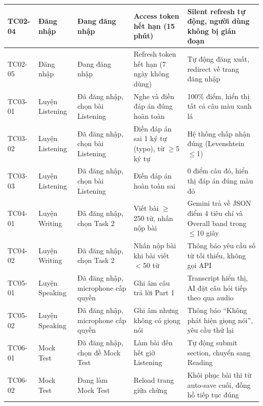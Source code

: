 \documentclass[a4paper,12pt]{extreport}
\begin{document}
\begin{longtable}{|p{1.3cm}|p{2.8cm}|p{2.8cm}|p{4.0cm}|p{3.0cm}|}
    TC02-04 & Đăng nhập & Đang đăng nhập & Access token hết hạn (15 phút) & Silent refresh tự động, người dùng không bị gián đoạn \\ \hline

    TC02-05 & Đăng nhập & Đang đăng nhập & Refresh token hết hạn (7 ngày không dùng) & Tự động đăng xuất, redirect về trang đăng nhập \\ \hline

    TC03-01 & Luyện Listening & Đã đăng nhập, chọn bài Listening & Nghe và điền đáp án đúng hoàn toàn & 100\% điểm, hiển thị tất cả câu màu xanh lá \\ \hline

    TC03-02 & Luyện Listening & Đã đăng nhập, chọn bài Listening & Điền đáp án sai 1 ký tự (typo), từ $\geq$5 ký tự & Hệ thống chấp nhận đúng (Levenshtein $\leq$1) \\ \hline

    TC03-03 & Luyện Listening & Đã đăng nhập, chọn bài Listening & Điền đáp án hoàn toàn sai & 0 điểm câu đó, hiển thị đáp án đúng màu đỏ \\ \hline

    TC04-01 & Luyện Writing & Đã đăng nhập, chọn Task 2 & Viết bài $\geq$250 từ, nhấn nộp bài & Gemini trả về JSON điểm 4 tiêu chí và Overall band trong $\leq$10 giây \\ \hline

    TC04-02 & Luyện Writing & Đã đăng nhập, chọn Task 2 & Nhấn nộp bài khi bài viết $<$50 từ & Thông báo yêu cầu số từ tối thiểu, không gọi API \\ \hline

    TC05-01 & Luyện Speaking & Đã đăng nhập, microphone cấp quyền & Ghi âm câu trả lời Part 1 & Transcript hiển thị, AI đặt câu hỏi tiếp theo qua audio \\ \hline

    TC05-02 & Luyện Speaking & Đã đăng nhập, microphone cấp quyền & Ghi âm nhưng không có giọng nói & Thông báo ``Không phát hiện giọng nói'', yêu cầu thử lại \\ \hline

    TC06-01 & Mock Test & Đã đăng nhập, chọn đề Mock Test & Làm bài đến hết giờ Listening & Tự động submit section, chuyển sang Reading \\ \hline

    TC06-02 & Mock Test & Đang làm Mock Test & Reload trang giữa chừng & Khôi phục bài thi từ auto-save cuối, đồng hồ tiếp tục đúng \\ \hline


\end{longtable}
\end{document}

